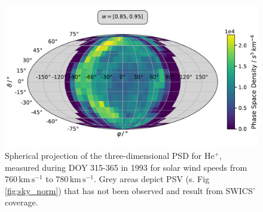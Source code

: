 \begin{figure}[h]
	\includegraphics[width=1\textwidth]{Figures/sky_ps.pdf}
	\centering
	\caption{Spherical projection of the three-dimensional PSD for $\mathrm{He^{+}}$, measured during DOY 315-365 in 1993 for solar wind speeds from $760 \, \mathrm{km\,s^{-1}}$ to $780 \, \mathrm{km\,s^{-1}}$. Grey areas depict PSV (s. Fig \ref{fig:sky_norm}) that has not been observed and result from SWICS' coverage.}
	\label{fig:sky_psd}
\end{figure}
%
%
%
\clearpage
